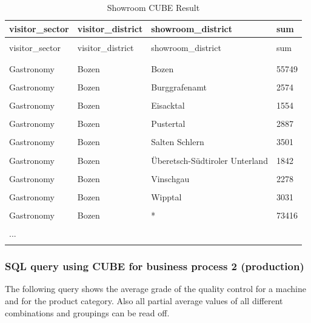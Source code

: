 \documentclass[letterpaper,12pt]{article}
\begin{document}
\begingroup
\renewcommand\arraystretch{0.5}
\begin{longtable}{p{4cm}p{3cm}p{4cm}p{2cm}}
        \caption{Showroom CUBE Result} \\
	visitor\_sector & visitor\_district & showroom\_district & sum \\
        \endfirsthead \\
        visitor\_sector & visitor\_district & showroom\_district & sum \\
        \endhead \\
        \hline \\
        Gastronomy & Bozen & Bozen & 55749 \\
        \hline \\
        Gastronomy & Bozen & Burggrafenamt  & 2574 \\
        \hline \\
        Gastronomy & Bozen & Eisacktal & 1554 \\
        \hline \\
        Gastronomy & Bozen & Pustertal & 2887 \\
        \hline \\
        Gastronomy & Bozen & Salten Schlern & 3501 \\
        \hline \\
        Gastronomy & Bozen & Überetsch-Südtiroler Unterland & 1842 \\
        \hline \\
        Gastronomy & Bozen & Vinschgau & 2278 \\
        \hline \\
        Gastronomy & Bozen & Wipptal & 3031 \\
        \hline \\
        Gastronomy & Bozen & * & 73416 \\
        \hline \\
        ... \\
        \hline \\
\end{longtable} 
\endgroup

\subsubsection{SQL query using CUBE for business process 2 (production)}

The following query shows the average grade of the quality control for a machine and for the product category. Also all partial average values of all different combinations and groupings can be read off.
\end{document}
